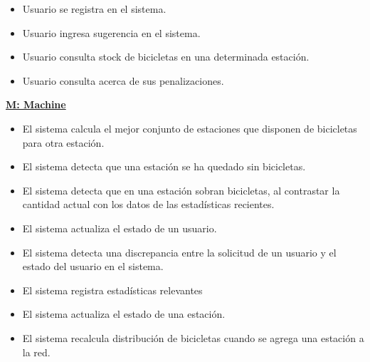 \begin{itemize}
\item Usuario se registra en el sistema.
\item Usuario ingresa sugerencia en el sistema.
\item Usuario consulta stock de bicicletas en una determinada estación.
\item Usuario consulta acerca de sus penalizaciones.

\end{itemize}


\vspace{1cm}
\textbf{\underline{M: Machine}}

\begin{itemize}
\item El sistema calcula el mejor conjunto de estaciones que disponen de bicicletas para otra estación.
\item El sistema detecta que una estación se ha quedado sin bicicletas.
\item El sistema detecta que en una estación sobran bicicletas, al contrastar la cantidad actual con los datos
de las estadísticas recientes.
\item El sistema actualiza el estado de un usuario.
\item El sistema detecta una discrepancia entre la solicitud de un usuario y el estado del usuario en el sistema.
\item El sistema registra estadísticas relevantes
\item El sistema actualiza el estado de una estación.
\item El sistema recalcula distribución de bicicletas cuando se agrega una estación a la red.
\end{itemize}



